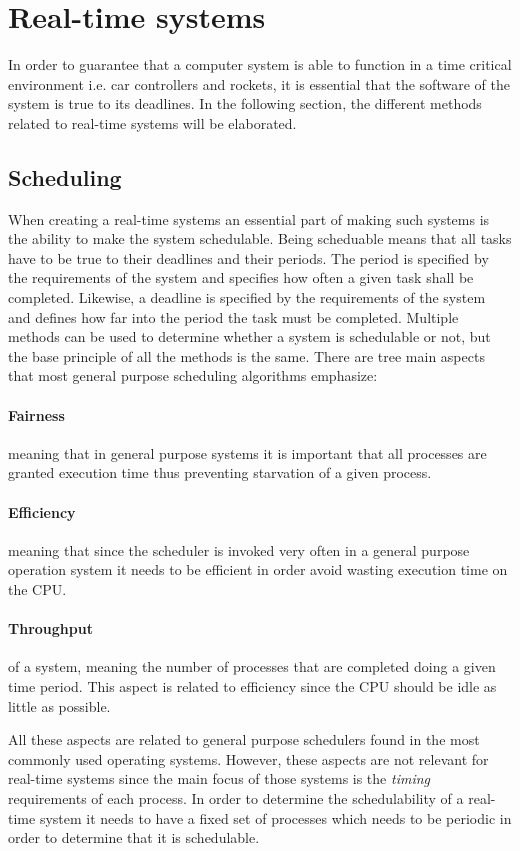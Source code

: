 \section{Real-time systems}\label{Theory:RTS}
In order to guarantee that a computer system is able to function in a time critical environment i.e. car controllers and rockets, it is essential that the software of the system is true to its deadlines. 
In the following section, the different methods related to real-time systems will be elaborated.

\subsection{Scheduling}
When creating a real-time systems an essential part of making such systems is the ability to make the system schedulable.
Being scheduable means that all tasks have to be true to their deadlines and their periods. 
The period is specified by the requirements of the system and specifies how often a given task shall be completed.
Likewise, a deadline is specified by the requirements of the system and defines how far into the period the task must be completed.
Multiple methods can be used to determine whether a system is schedulable or not, but the base principle of all the methods is the same. 
There are tree main aspects that most general purpose scheduling algorithms emphasize:
\paragraph{Fairness} meaning that in general purpose systems it is important that all processes are granted execution time thus preventing starvation of a given process. 
\paragraph{Efficiency} meaning that since the scheduler is invoked very often in a general purpose operation system it needs to be efficient in order avoid wasting execution time on the CPU. 
\paragraph{Throughput} of a system, meaning the number of processes that are completed doing a given time period.
This aspect is related to efficiency since the CPU should be idle as little as possible. 

All these aspects are related to general purpose schedulers found in the most commonly used operating systems. 
However, these aspects are not relevant for real-time systems since the main focus of those systems is the \textit{timing} requirements of each process.
In order to determine the schedulability of a real-time system it needs to have a fixed set of processes which needs to be periodic in order to determine that it is schedulable.


